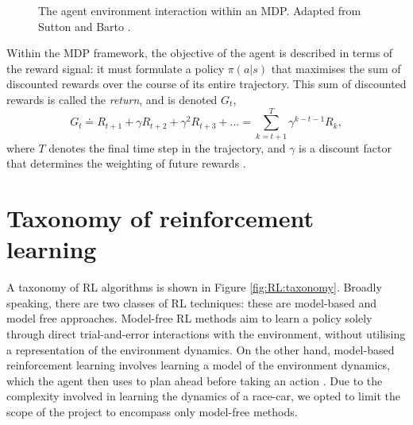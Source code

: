 \begin{figure}[!htb]
\centering

\caption[The agent environment interaction within an MDP]{The agent environment interaction within an MDP. Adapted from Sutton and Barto \cite{sutton2020}. }
\label{fig:agent_env_boundary}
\end{figure}


Within the MDP framework, the objective of the agent is described in terms of the reward signal: it must formulate a policy $\pi(a|s)$ that maximises the sum of discounted rewards over the course of its entire trajectory.
This sum of discounted rewards is called the \emph{return}, and is denoted $G_t$,
\begin{equation}
G_t \doteq R_{t+1} + \gamma R_{t+2} + \gamma^2 R_{t+3} + ... = \sum_{k=t+1}^{T} \gamma^{k-t-1} R_{k},
\label{eq:G_t_discount}
\end{equation}
where $T$ denotes the final time step in the trajectory, and $\gamma$ is a discount factor that determines the weighting of future rewards \cite{sutton2020}.
















\section{Taxonomy of reinforcement learning}

A taxonomy of RL algorithms is shown in Figure \ref{fig:RL:taxonomy}.
Broadly speaking, there are two classes of RL techniques: these are model-based and model free approaches.
Model-free RL methods aim to learn a policy solely through direct trial-and-error interactions with the environment, without utilising a representation of the environment dynamics.
On the other hand, model-based reinforcement learning involves learning a model of the environment dynamics, which the agent then uses to plan ahead before taking an action \cite{wang2019benchmarking}.
Due to the complexity involved in learning the dynamics of a race-car, we opted to limit the scope of the project to encompass only model-free methods.

